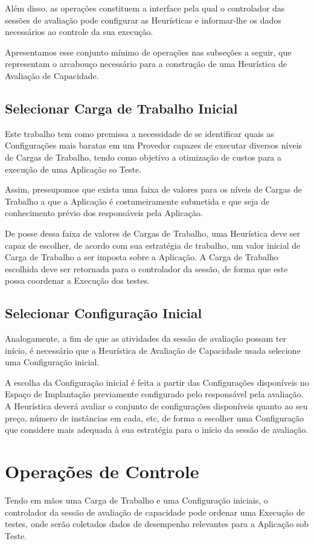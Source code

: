 Além disso, as operações constituem a interface pela qual o controlador das 
sessões de avaliação pode configurar as Heurísticas e informar-lhe os dados 
necessários ao controle da sua execução.
 
Apresentamos esse conjunto mínimo de operações nas subseções a seguir, que 
representam o arcabouço necessário para a construção de uma Heurística de 
Avaliação de Capacidade.

\subsection{Selecionar Carga de Trabalho Inicial}
Este trabalho tem como premissa a necessidade de se identificar quais as 
Configurações mais baratas em um Provedor capazes de executar diversos níveis de
Cargas de Trabalho, tendo como objetivo a otimização de custos para a execução de
uma Aplicação so Teste.

Assim, pressupomos que exista uma faixa de valores para os níveis de Cargas de 
Trabalho a que a Aplicação é costumeiramente submetida e que seja de conhecimento
prévio dos responsáveis pela Aplicação. 

De posse dessa faixa de valores de Cargas de Trabalho, uma Heurística deve ser 
capaz de escolher, de acordo com sua estratégia de trabalho, um valor inicial de
Carga de Trabalho a ser imposta sobre a Aplicação. A Carga de Trabalho escolhida
deve ser retornada para o controlador da sessão, de forma que este possa coordenar
a Execução dos testes.
 
\subsection{Selecionar Configuração Inicial}
Analogamente, a fim de que as atividades da sessão de avaliação possam ter início,
é necessário que a Heurística de Avaliação de Capacidade usada selecione uma
Configuração inicial.

A escolha da Configuração inicial é feita a partir das Configurações disponíveis
no Espaço de Implantação previamente configurado pelo responsável pela avaliação.
A Heurística deverá avaliar o conjunto de configurações disponíveis quanto ao seu
preço, número de instâncias em cada, etc, de forma a escolher uma Configuração 
que considere mais adequada à sua estratégia para o início da sessão de avaliação.

\section{Operações de Controle}
Tendo em mãos uma Carga de Trabalho e uma Configuração iniciais, o controlador
da sessão de avaliação de capacidade pode ordenar uma Execução de testes, onde
serão coletados dados de desempenho relevantes para a Aplicação sob Teste.

